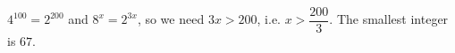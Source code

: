 $4^{100}=2^{200}$ and $8^x=2^{3x}$, so we need $3x>200$, i.e. $x>\dfrac{200}{3}$. The smallest integer is $\boxed{67}$.
